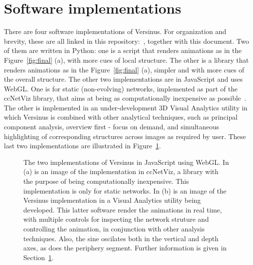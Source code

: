 \documentclass[runningheads]{llncs}
\begin{document}
\section{Software implementations}\label{sec:imp}
There are four software implementations of Versinus.
For organization and brevity, these are all linked in this repository:~\cite{verRepo}, together with this document.
Two of them are written in Python: one is a script that renders animations as in the Figure~\ref{fig:final} (a), with more cues of local structure. The other is a library that renders animations as in the Figure~\ref{fig:final} (a), simpler and with more cues of the overall structure.
The other two implementations are in JavaScript and uses WebGL. One is for static (non-evolving) networks, implemented as part of the ccNetViz library, that aims at being as computationally inexpensive as possible~\cite{cell}. The other is implemented in an under-development 3D Visual Analytics utility in which Versinus is combined with other analytical techniques, such as principal component analysis, overview first - focus on demand, and simultaneous highlighting of corresponding structures across images as required by user.
These last two implementations are illustrated in Figure~\ref{fig:extra}.

\begin{figure}[!h]\centering
    \qquad
    \caption{The two implementations of Versinus in JavaScript using WebGL. In (a) is an image of the implementation in ccNetViz, a library with the purpose of being computationally inexpensive. This implementation is only for static networks. In (b) is an image of the Versinus implementation in a Visual Analytics utility being developed. This latter software render the animations in real time, with multiple controls for inspecting the network struture and controlling the animation, in conjunction with other analysis techniques. Also, the sine oscilates both in the vertical and depth axes, as does the periphery segment. Further information is given in Section~\ref{sec:imp}.}
    \label{fig:extra}
\end{figure}
\end{document}
